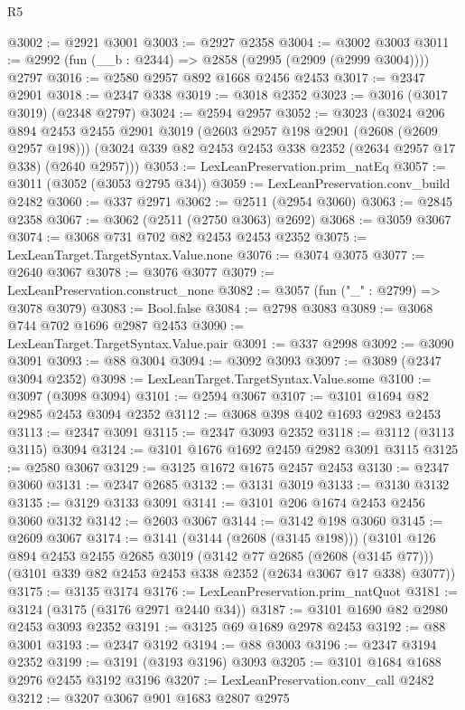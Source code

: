 \begin{lexlean}{R5}
\begin{coremodule}
@3002 := @2921 @3001
@3003 := @2927 @2358
@3004 := @3002 @3003
@3011 := @2992 (fun (__b : @2344) => @2858 (@2995 (@2909 (@2999 @3004)))) @2797
@3016 := @2580 @2957 @892 @1668 @2456 @2453
@3017 := @2347 @2901
@3018 := @2347 @338
@3019 := @3018 @2352
@3023 := @3016 (@3017 @3019) (@2348 @2797)
@3024 := @2594 @2957
@3052 := @3023
    (@3024
      @206
      @894
      @2453
      @2455
      @2901
      @3019
      (@2603 @2957 @198 @2901 (@2608 (@2609 @2957 @198)))
      (@3024 @339 @82 @2453 @2453 @338 @2352 (@2634 @2957 @17 @338) (@2640 @2957)))
@3053 := LexLeanPreservation.prim_natEq
@3057 := @3011 (@3052 (@3053 @2795 @34))
@3059 := LexLeanPreservation.conv_build @2482
@3060 := @337 @2971
@3062 := @2511 (@2954 @3060)
@3063 := @2845 @2358
@3067 := @3062 (@2511 (@2750 @3063) @2692)
@3068 := @3059 @3067
@3074 := @3068 @731 @702 @82 @2453 @2453 @2352
@3075 := LexLeanTarget.TargetSyntax.Value.none
@3076 := @3074 @3075
@3077 := @2640 @3067
@3078 := @3076 @3077
@3079 := LexLeanPreservation.construct_none
@3082 := @3057 (fun ("_" : @2799) => @3078 @3079)
@3083 := Bool.false
@3084 := @2798 @3083
@3089 := @3068 @744 @702 @1696 @2987 @2453
@3090 := LexLeanTarget.TargetSyntax.Value.pair
@3091 := @337 @2998
@3092 := @3090 @3091
@3093 := @88 @3004
@3094 := @3092 @3093
@3097 := @3089 (@2347 @3094 @2352)
@3098 := LexLeanTarget.TargetSyntax.Value.some
@3100 := @3097 (@3098 @3094)
@3101 := @2594 @3067
@3107 := @3101 @1694 @82 @2985 @2453 @3094 @2352
@3112 := @3068 @398 @402 @1693 @2983 @2453
@3113 := @2347 @3091
@3115 := @2347 @3093 @2352
@3118 := @3112 (@3113 @3115) @3094
@3124 := @3101 @1676 @1692 @2459 @2982 @3091 @3115
@3125 := @2580 @3067
@3129 := @3125 @1672 @1675 @2457 @2453
@3130 := @2347 @3060
@3131 := @2347 @2685
@3132 := @3131 @3019
@3133 := @3130 @3132
@3135 := @3129 @3133 @3091
@3141 := @3101 @206 @1674 @2453 @2456 @3060 @3132
@3142 := @2603 @3067
@3144 := @3142 @198 @3060
@3145 := @2609 @3067
@3174 := @3141
    (@3144 (@2608 (@3145 @198)))
    (@3101
      @126
      @894
      @2453
      @2455
      @2685
      @3019
      (@3142 @77 @2685 (@2608 (@3145 @77)))
      (@3101 @339 @82 @2453 @2453 @338 @2352 (@2634 @3067 @17 @338) @3077))
@3175 := @3135 @3174
@3176 := LexLeanPreservation.prim_natQuot
@3181 := @3124 (@3175 (@3176 @2971 @2440 @34))
@3187 := @3101 @1690 @82 @2980 @2453 @3093 @2352
@3191 := @3125 @69 @1689 @2978 @2453
@3192 := @88 @3001
@3193 := @2347 @3192
@3194 := @88 @3003
@3196 := @2347 @3194 @2352
@3199 := @3191 (@3193 @3196) @3093
@3205 := @3101 @1684 @1688 @2976 @2455 @3192 @3196
@3207 := LexLeanPreservation.conv_call @2482
@3212 := @3207 @3067 @901 @1683 @2807 @2975

\end{coremodule}
\end{lexlean}
